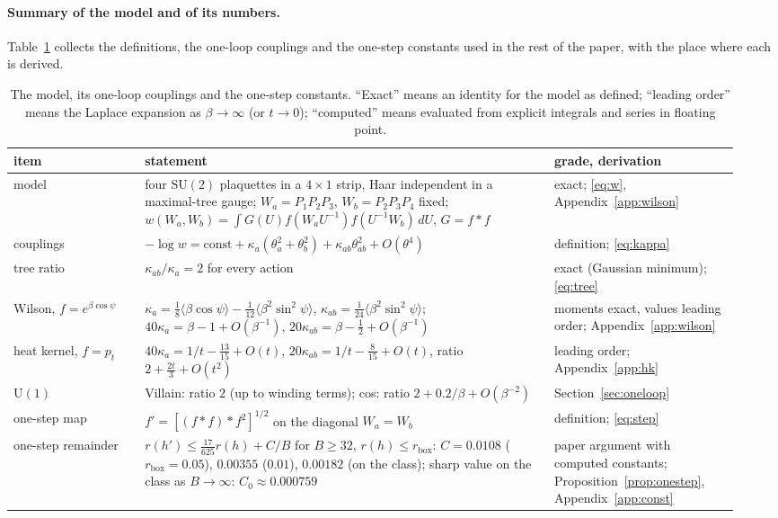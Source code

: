\documentclass[11pt,a4paper]{article}
\theoremstyle{definition}
\theoremstyle{remark}
\newcommand{\SU}{\mathrm{SU}(2)}
\begin{document}
\paragraph{Summary of the model and of its numbers.}
Table~\ref{tab:model} collects the definitions, the one-loop couplings and the one-step constants used in the rest of the paper, with the place where each is derived.

\begin{table}[h]
\centering\small
\caption{The model, its one-loop couplings and the one-step constants. ``Exact'' means an identity for the model as defined; ``leading order'' means the Laplace expansion as $\beta\to\infty$ (or $t\to0$); ``computed'' means evaluated from explicit integrals and series in floating point.}\label{tab:model}
\begin{tabular}{@{}>{\raggedright\arraybackslash}p{0.17\linewidth}>{\raggedright\arraybackslash}p{0.53\linewidth}>{\raggedright\arraybackslash}p{0.24\linewidth}@{}}
\toprule
item & statement & grade, derivation \\ \midrule
model & four $\SU$ plaquettes in a $4\times1$ strip, Haar independent in a maximal-tree gauge; $W_a=P_1P_2P_3$, $W_b=P_2P_3P_4$ fixed; $w(W_a,W_b)=\int G(U)f(W_aU^{-1})f(U^{-1}W_b)\,dU$, $G=f*f$ & exact; \eqref{eq:w}, Appendix~\ref{app:wilson} \\
couplings & $-\log w=\mathrm{const}+\kappa_a(\theta_a^2+\theta_b^2)+\kappa_{ab}\theta_{ab}^2+O(\theta^4)$ & definition; \eqref{eq:kappa} \\
tree ratio & $\kappa_{ab}/\kappa_a=2$ for every action & exact (Gaussian minimum); \eqref{eq:tree} \\
Wilson, $f=e^{\beta\cos\psi}$ & $\kappa_a=\tfrac18\langle\beta\cos\psi\rangle-\tfrac1{12}\langle\beta^2\sin^2\psi\rangle$, $\kappa_{ab}=\tfrac1{24}\langle\beta^2\sin^2\psi\rangle$; $40\kappa_a=\beta-1+O(\beta^{-1})$, $20\kappa_{ab}=\beta-\tfrac12+O(\beta^{-1})$ & moments exact, values leading order; Appendix~\ref{app:wilson} \\
heat kernel, $f=p_t$ & $40\kappa_a=1/t-\tfrac{13}{15}+O(t)$, $20\kappa_{ab}=1/t-\tfrac8{15}+O(t)$, ratio $2+\tfrac{2t}3+O(t^2)$ & leading order; Appendix~\ref{app:hk} \\
$\mathrm{U}(1)$ & Villain: ratio $2$ (up to winding terms); cos: ratio $2+0.2/\beta+O(\beta^{-2})$ & Section~\ref{sec:oneloop} \\
one-step map & $f'=[(f*f)*f^2]^{1/2}$ on the diagonal $W_a=W_b$ & definition; \eqref{eq:step} \\
one-step remainder & $r(h')\le\tfrac{17}{625}r(h)+C/B$ for $B\ge32$, $r(h)\le r_{\mathrm{box}}$: $C=0.0108$ ($r_{\mathrm{box}}=0.05$), $0.00355$ ($0.01$), $0.00182$ (on the class); sharp value on the class as $B\to\infty$: $C_0\approx0.000759$ & paper argument with computed constants; Proposition~\ref{prop:onestep}, Appendix~\ref{app:const} \\
\bottomrule
\end{tabular}
\end{table}
\end{document}
